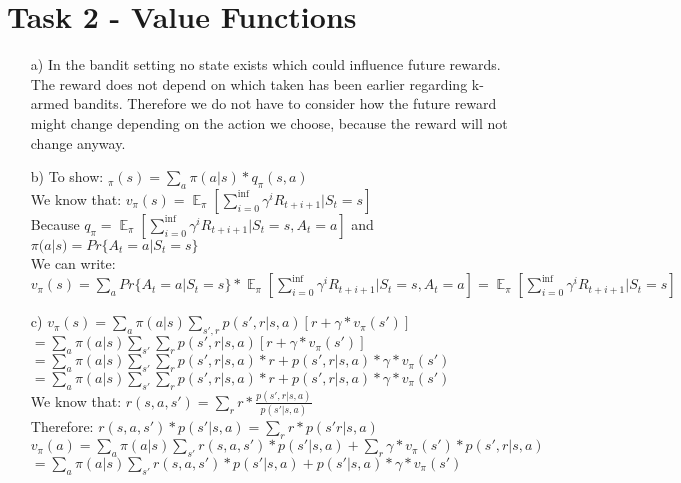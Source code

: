 \documentclass[a4paper]{article}
\DeclareMathOperator{\EX}{\mathbb{E}}%
\begin{document}
	\section*{Task 2 - Value Functions}
	\begin{itemize}
		\item[a)] In the bandit setting no state exists which could influence future rewards. 
				  The reward does not depend on which taken has been earlier regarding k-armed bandits.
				  Therefore we do not have to consider how the future reward might change depending on the action we choose, because the reward will not change anyway.
		\item[b)] To show: $_\pi(s) = \sum_{a}^{} \pi(a|s)*q_\pi(s,a)$ \\
				  We know that: $v_\pi(s) = \EX_\pi [\sum_{i=0}^{\inf}\gamma^iR_{t+i+1}| S_t = s]$ \\
				  Because $q_\pi = \EX_\pi [\sum_{i=0}^{\inf}\gamma^iR_{t+i+1}| S_t = s, A_t = a]$ and 
				  $\pi(a|s) = Pr\{A_t=a|S_t=s\}$ \\
				  We can write: \\ $v_\pi(s) = \sum_{a}^{}Pr\{A_t=a|S_t=s\}*\EX_\pi [\sum_{i=0}^{\inf}\gamma^iR_{t+i+1}| S_t = s, A_t = a] = \EX_\pi [\sum_{i=0}^{\inf}\gamma^iR_{t+i+1}| S_t = s]$
		\item[c)] $v_\pi(s)=\sum_{a}^{}\pi(a|s)\sum_{s',r}^{}p(s',r|s,a)[r+\gamma*v_\pi(s')]$ \\
				  $ = \sum_{a}^{}\pi(a|s)\sum_{s'}^{}\sum_{r}^{}p(s',r|s,a)[r+\gamma*v_\pi(s')] $ \\
				  $ = \sum_{a}^{}\pi(a|s)\sum_{s'}^{}\sum_{r}^{}p(s',r|s,a)*r + p(s',r|s,a)*\gamma*v_\pi(s')$ \\
				  $ = \sum_{a}^{}\pi(a|s)\sum_{s'}^{}\sum_{r}^{}p(s',r|s,a)*r + p(s',r|s,a)*\gamma*v_\pi(s')$ \\
				  We know that: $r(s,a,s') = \sum_{r}^{}r*\frac{p(s',r|s,a)}{p(s'|s,a)}$ \\
				  Therefore: $r(s,a,s') * p(s'|s,a) = \sum_{r}^{} r*p(s'r|s,a)$ \\
				  $ v_\pi(a) = \sum_{a}^{}\pi(a|s)\sum_{s'}^{}r(s,a,s')*p(s'|s,a)+\sum_{r}\gamma*v_\pi(s')*p(s',r|s,a)$ \\
				  $ = \sum_{a}^{}\pi(a|s)\sum_{s'}^{}r(s,a,s')*p(s'|s,a)+p(s'|s,a)*\gamma*v_\pi(s')$
	\end{itemize}
\end{document}
